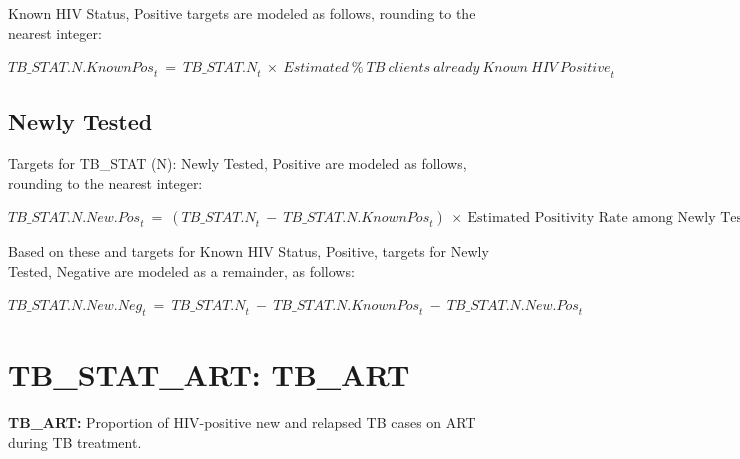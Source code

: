 \documentclass[
  openany]{book}
\begin{document}
Known HIV Status, Positive targets are modeled as follows, rounding to
the nearest integer:

\begin{center} ${TB\_ STAT.N.KnownPos}_{t}\  = \ {TB\_ STAT.N}_{t}\  \times \ {Estimated\ \%\ TB\ clients\ already\ Known\ HIV\ Positive}_{t}$ \end{center}

\hypertarget{newly-tested}{%
\subsection{Newly Tested}\label{newly-tested}}

Targets for TB\_STAT (N): Newly Tested, Positive are modeled as follows,
rounding to the nearest integer:

\begin{center} ${TB\_ STAT.N.New.Pos}_{t}\  = \ ({TB\_ STAT.N}_{t}\  - \ {TB\_ STAT.N.KnownPos}_{t})\  \times \ \text{Estimated Positivity Rate among Newly Tested}_{t}$ \end{center}

Based on these and targets for Known HIV Status, Positive, targets for
Newly Tested, Negative are modeled as a remainder, as follows:

\begin{center} ${TB\_ STAT.N.New.Neg}_{t}\  = \ {TB\_ STAT.N}_{t}\  - \ {TB\_ STAT.N.KnownPos}_{t}\  - \ {TB\_ STAT.N.New.Pos}_{t}$ \end{center}

\textbf{\hfill\break
}

\hypertarget{tb_stat_art-tb_art}{%
\section{TB\_STAT\_ART: TB\_ART}\label{tb_stat_art-tb_art}}

\textbf{TB\_ART:} Proportion of HIV-positive new and relapsed TB cases on ART
during TB treatment.
\end{document}
